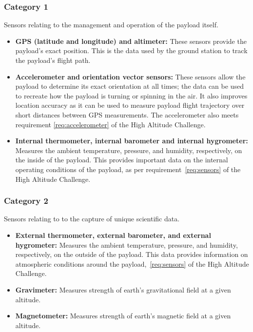 \documentclass[english]{report}
\begin{document}
\subsubsection*{Category 1}

Sensors relating to the management and operation of the payload itself.
\begin{itemize}
\item \textbf{GPS (latitude and longitude) and altimeter: }These sensors
provide the payload's exact position. This is the data used by the
ground station to track the payload's flight path.
\item \textbf{Accelerometer and orientation vector sensors: }These sensors
allow the payload to determine its exact orientation at all times;
the data can be used to recreate how the payload is turning or spinning
in the air. It also improves location accuracy as it can be used to
measure payload flight trajectory over short distances between GPS
measurements.  The accelerometer also meets requirement \ref{req:accelerometer} of the High Altitude Challenge.
\item \textbf{Internal thermometer, internal barometer and internal hygrometer:}
Measures the ambient temperature, pressure, and humidity, respectively,
on the inside of the payload. This provides important data on the
internal operating conditions of the payload, as per requirement~\ref{req:sensors} of the High Altitude Challenge.
\end{itemize}

\subsubsection*{Category 2}

Sensors relating to to the capture of unique scientific data.
\begin{itemize}
\item \textbf{External thermometer, external barometer, and external hygrometer:
}Measures the ambient temperature, pressure, and humidity, respectively,
on the outside of the payload. This data provides information on atmospheric
conditions around the payload,~\ref{req:sensors} of the High Altitude Challenge.
\item \textbf{Gravimeter: }Measures strength of earth's gravitational field
at a given altitude.
\item \textbf{Magnetometer: }Measures strength of earth's magnetic field
at a given altitude.
\end{itemize}
\end{document}
